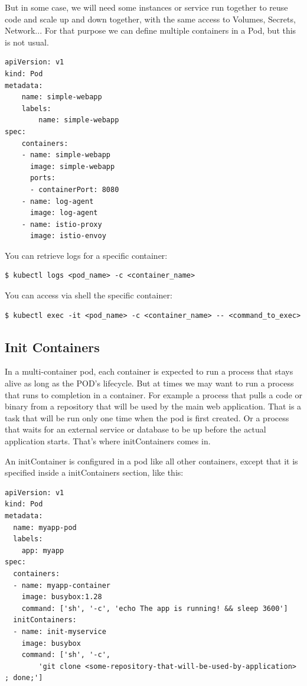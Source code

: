 \documentclass{article}
\newenvironment{codetemplate}[1][]{%
  \mybasecolorbox[#1]
  \itshape
}{%
  \endmybasecolorbox
}
\begin{document}
But in some case, we will need some instances or service run together to reuse code and scale up and down together, with the same access to Volumes, Secrets, Network... For that purpose we can define multiple containers in a Pod, but this is not usual.

\begin{codetemplate}{}
\begin{verbatim}
apiVersion: v1
kind: Pod
metadata:
    name: simple-webapp
    labels:
        name: simple-webapp
spec:
    containers:
    - name: simple-webapp
      image: simple-webapp
      ports:
      - containerPort: 8080
    - name: log-agent
      image: log-agent
    - name: istio-proxy
      image: istio-envoy
\end{verbatim}
\end{codetemplate}

You can retrieve logs for a specific container:
\begin{codetemplate}{}
\begin{verbatim}
$ kubectl logs <pod_name> -c <container_name>
\end{verbatim}
\end{codetemplate}

You can access via shell the specific container:
\begin{codetemplate}{}
\begin{verbatim}
$ kubectl exec -it <pod_name> -c <container_name> -- <command_to_exec>
\end{verbatim}
\end{codetemplate}

\subsection{Init Containers}
In a multi-container pod, each container is expected to run a process that stays alive as long as the POD's lifecycle. But at times we may want to run a process that runs to completion in a container. For example a process that pulls a code or binary from a repository that will be used by the main web application. That is a task that will be run only  one time when the pod is first created. Or a process that waits  for an external service or database to be up before the actual application starts. That's where initContainers comes in.

An initContainer is configured in a pod like all other containers, except that it is specified inside a initContainers section,  like this:

\begin{codetemplate}{}
\begin{verbatim}
apiVersion: v1
kind: Pod
metadata:
  name: myapp-pod
  labels:
    app: myapp
spec:
  containers:
  - name: myapp-container
    image: busybox:1.28
    command: ['sh', '-c', 'echo The app is running! && sleep 3600']
  initContainers:
  - name: init-myservice
    image: busybox
    command: ['sh', '-c', 
        'git clone <some-repository-that-will-be-used-by-application> ; done;']
\end{verbatim}
\end{codetemplate}
\end{document}
